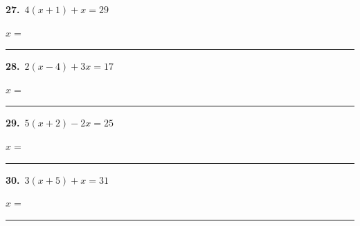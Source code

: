 \documentclass[11pt,letterpaper]{article}
\begin{document}
\needspace{3.5cm}\par\vspace{3mm}\noindent \begin{minipage}[t][3.0cm]{0.48\linewidth}\raggedright{\color{fmturn}\bfseries 27.}\ $4(x + 1) + x = 29$\par\vfill\hfill $x = $\ \rule{3.2cm}{0.4pt}\end{minipage}\hfill \begin{minipage}[t][3.0cm]{0.48\linewidth}\raggedright{\color{fmturn}\bfseries 28.}\ $2(x - 4) + 3x = 17$\par\vfill\hfill $x = $\ \rule{3.2cm}{0.4pt}\end{minipage}\par
\needspace{3.5cm}\par\vspace{3mm}\noindent \begin{minipage}[t][3.0cm]{0.48\linewidth}\raggedright{\color{fmturn}\bfseries 29.}\ $5(x + 2) - 2x = 25$\par\vfill\hfill $x = $\ \rule{3.2cm}{0.4pt}\end{minipage}\hfill \begin{minipage}[t][3.0cm]{0.48\linewidth}\raggedright{\color{fmturn}\bfseries 30.}\ $3(x + 5) + x = 31$\par\vfill\hfill $x = $\ \rule{3.2cm}{0.4pt}\end{minipage}\par
\end{document}
